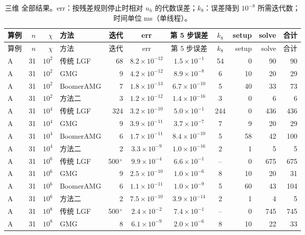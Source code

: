 \begingroup\footnotesize\setlength{\tabcolsep}{3pt}
\begin{longtable}{lrrlrcccrrr}
\caption{三维 全部结果。err：按残差规则停止时相对 $u_h$ 的代数误差；$k_8$：误差降到 $10^{-8}$ 所需迭代数；时间单位 ms（单线程）。}\\
\toprule 算例 & $n$ & $\chi$ & 方法 & 迭代 & err & 第 5 步误差 & $k_8$ & setup & solve & 合计 \\ \midrule
\endfirsthead \toprule 算例 & $n$ & $\chi$ & 方法 & 迭代 & err & 第 5 步误差 & $k_8$ & setup & solve & 合计 \\ \midrule \endhead
A & 31 & $10^{2}$ & 传统 LGF & 68 & $8.2{\times}10^{-12}$ & $1.5{\times}10^{-1}$ & 54 & 0 & 90 & 90 \\
A & 31 & $10^{2}$ & GMG & 9 & $4.2{\times}10^{-12}$ & $8.9{\times}10^{-8}$ & 6 & 10 & 20 & 29 \\
A & 31 & $10^{2}$ & BoomerAMG & 7 & $1.8{\times}10^{-13}$ & $6.7{\times}10^{-10}$ & 5 & 40 & 33 & 73 \\
A & 31 & $10^{2}$ & 方法二 & 3 & $1.2{\times}10^{-12}$ & $1.4{\times}10^{-16}$ & 3 & 0 & 6 & 6 \\
A & 31 & $10^{4}$ & 传统 LGF & 324 & $3.2{\times}10^{-10}$ & $5.0{\times}10^{-1}$ & 244 & 0 & 436 & 436 \\
A & 31 & $10^{4}$ & GMG & 9 & $3.9{\times}10^{-11}$ & $3.7{\times}10^{-7}$ & 7 & 9 & 20 & 29 \\
A & 31 & $10^{4}$ & BoomerAMG & 6 & $1.7{\times}10^{-11}$ & $8.4{\times}10^{-10}$ & 5 & 58 & 42 & 100 \\
A & 31 & $10^{4}$ & 方法二 & 2 & $3.3{\times}10^{-9}$ & $1.0{\times}10^{-16}$ & 2 & 1 & 5 & 5 \\
A & 31 & $10^{6}$ & 传统 LGF & 500$^\times$ & $9.9{\times}10^{-4}$ & $6.6{\times}10^{-1}$ & -- & 0 & 675 & 675 \\
A & 31 & $10^{6}$ & GMG & 9 & $2.5{\times}10^{-10}$ & $1.0{\times}10^{-6}$ & 8 & 10 & 20 & 31 \\
A & 31 & $10^{6}$ & BoomerAMG & 6 & $1.1{\times}10^{-11}$ & $1.0{\times}10^{-9}$ & 5 & 60 & 43 & 104 \\
A & 31 & $10^{6}$ & 方法二 & 2 & $7.5{\times}10^{-10}$ & $3.9{\times}10^{-14}$ & 2 & 1 & 4 & 5 \\
A & 31 & $10^{8}$ & 传统 LGF & 500$^\times$ & $2.4{\times}10^{-2}$ & $7.4{\times}10^{-1}$ & -- & 0 & 745 & 745 \\
A & 31 & $10^{8}$ & GMG & 8 & $6.1{\times}10^{-9}$ & $2.0{\times}10^{-6}$ & 8 & 10 & 22 & 33 \\

\end{longtable}
